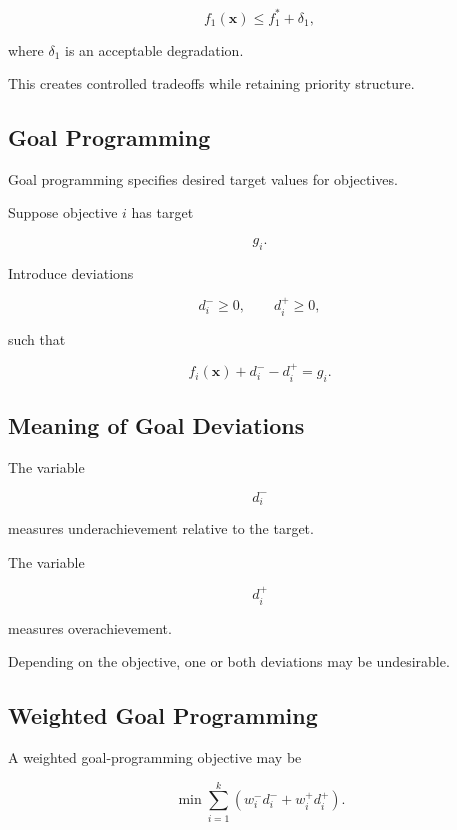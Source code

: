 \[
\boxed{
f_1(\mathbf{x})
\leq
f_1^*+\delta_1,
}
\]

where \(\delta_1\) is an acceptable degradation.

This creates controlled tradeoffs while retaining priority structure.

\subsection{Goal Programming}
\label{subsec:goal-programming}

Goal programming specifies desired target values for objectives.

Suppose objective \(i\) has target

\[
g_i.
\]

Introduce deviations

\[
d_i^-\geq0,
\qquad
d_i^+\geq0,
\]

such that

\[
\boxed{
f_i(\mathbf{x})
+
d_i^-
-
d_i^+
=
g_i.
}
\]

\subsection{Meaning of Goal Deviations}
\label{subsec:goal-deviations}

The variable

\[
d_i^-
\]

measures underachievement relative to the target.

The variable

\[
d_i^+
\]

measures overachievement.

Depending on the objective, one or both deviations may be undesirable.

\subsection{Weighted Goal Programming}
\label{subsec:weighted-goal-programming}

A weighted goal-programming objective may be

\[
\boxed{
\min
\sum_{i=1}^{k}
\left(
w_i^-d_i^-
+
w_i^+d_i^+
\right).
}
\]

